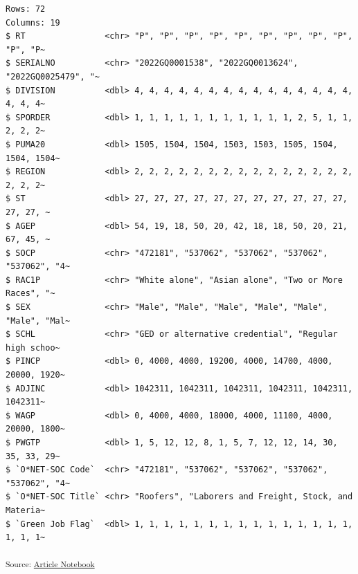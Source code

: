 \documentclass[
  letterpaper,
  DIV=11,
  numbers=noendperiod]{scrartcl}
\begin{document}
\begin{verbatim}
Rows: 72
Columns: 19
$ RT                <chr> "P", "P", "P", "P", "P", "P", "P", "P", "P", "P", "P~
$ SERIALNO          <chr> "2022GQ0001538", "2022GQ0013624", "2022GQ0025479", "~
$ DIVISION          <dbl> 4, 4, 4, 4, 4, 4, 4, 4, 4, 4, 4, 4, 4, 4, 4, 4, 4, 4~
$ SPORDER           <dbl> 1, 1, 1, 1, 1, 1, 1, 1, 1, 1, 1, 2, 5, 1, 1, 2, 2, 2~
$ PUMA20            <dbl> 1505, 1504, 1504, 1503, 1503, 1505, 1504, 1504, 1504~
$ REGION            <dbl> 2, 2, 2, 2, 2, 2, 2, 2, 2, 2, 2, 2, 2, 2, 2, 2, 2, 2~
$ ST                <dbl> 27, 27, 27, 27, 27, 27, 27, 27, 27, 27, 27, 27, 27, ~
$ AGEP              <dbl> 54, 19, 18, 50, 20, 42, 18, 18, 50, 20, 21, 67, 45, ~
$ SOCP              <chr> "472181", "537062", "537062", "537062", "537062", "4~
$ RAC1P             <chr> "White alone", "Asian alone", "Two or More Races", "~
$ SEX               <chr> "Male", "Male", "Male", "Male", "Male", "Male", "Mal~
$ SCHL              <chr> "GED or alternative credential", "Regular high schoo~
$ PINCP             <dbl> 0, 4000, 4000, 19200, 4000, 14700, 4000, 20000, 1920~
$ ADJINC            <dbl> 1042311, 1042311, 1042311, 1042311, 1042311, 1042311~
$ WAGP              <dbl> 0, 4000, 4000, 18000, 4000, 11100, 4000, 20000, 1800~
$ PWGTP             <dbl> 1, 5, 12, 12, 8, 1, 5, 7, 12, 12, 14, 30, 35, 33, 29~
$ `O*NET-SOC Code`  <chr> "472181", "537062", "537062", "537062", "537062", "4~
$ `O*NET-SOC Title` <chr> "Roofers", "Laborers and Freight, Stock, and Materia~
$ `Green Job Flag`  <dbl> 1, 1, 1, 1, 1, 1, 1, 1, 1, 1, 1, 1, 1, 1, 1, 1, 1, 1~
\end{verbatim}

\textsubscript{Source:
\href{https://beeckcenter.github.io/climate-equity-workforce/index-preview.html}{Article
Notebook}}
\end{document}
